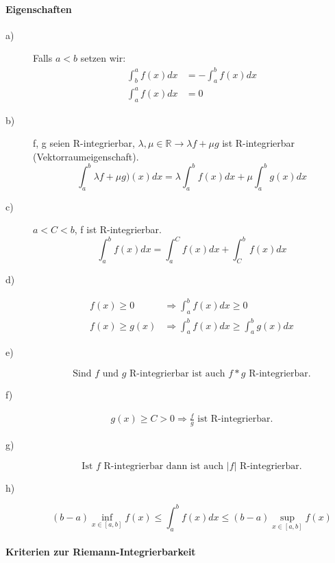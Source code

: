 \documentclass[12pt,a4paper]{report}%
\numberwithin{equation}{section}
\newcommand{\R}{\mathbb{R}} %
\newcommand{\subsubsubsection}{\paragraph}
\numberwithin{equation}{subsection}
\begin{document}
\subsubsubsection{Eigenschaften}
\begin{description}
\item[a)]
Falls $a<b$ setzen wir:
\begin{align}
\int_b^a f(x) dx &= -\int_a^bf(x)dx \nonumber \\
\int_a^a f(x) dx &= 0
\end{align}
\item[b)]
f, g seien R-integrierbar, $\lambda , \mu \in \R \rightarrow \lambda f + \mu g$ ist R-integrierbar (Vektorraumeigenschaft).
\begin{equation}
\int_a^b \lambda f + \mu g)(x)dx = \lambda \int_a^b f(x) dx + \mu \int_a^b g(x) dx
\end{equation}
\item[c)]
$a<C<b$, f ist R-integrierbar.
\begin{equation}
\int_a^b f(x) dx = \int_a^C f(x) dx + \int_C^b f(x) dx
\end{equation}
\item[d)]
\begin{align}
f(x) \ge 0 &\Rightarrow \int_a^b f(x) dx \ge 0 \nonumber \\
f(x) \ge g(x) &\Rightarrow \int_a^b f(x) dx \ge \int_a^b g(x)dx
\end{align}
\item[e)]
\begin{equation}
\text{Sind $f$ und $g$ R-integrierbar ist auch $f*g$ R-integrierbar.}
\end{equation}
\item[f)]
\begin{align}
g(x) \ge C > 0 \Rightarrow \frac{f}{g} \text{ ist R-integrierbar.}
\end{align}
\item[g)]
\begin{equation}
\text{Ist $f$ R-integrierbar dann ist auch } |f| \text{ R-integrierbar.}
\end{equation} 
\item[h)]
\begin{equation}
(b-a) \inf_{x\in[a,b]}{f(x)} \le \int_a^b f(x) dx \le (b-a) \sup_{x\in [a,b]}{f(x)}
\end{equation}
\end{description}

\subsubsubsection{Kriterien zur Riemann-Integrierbarkeit}
\end{document}
